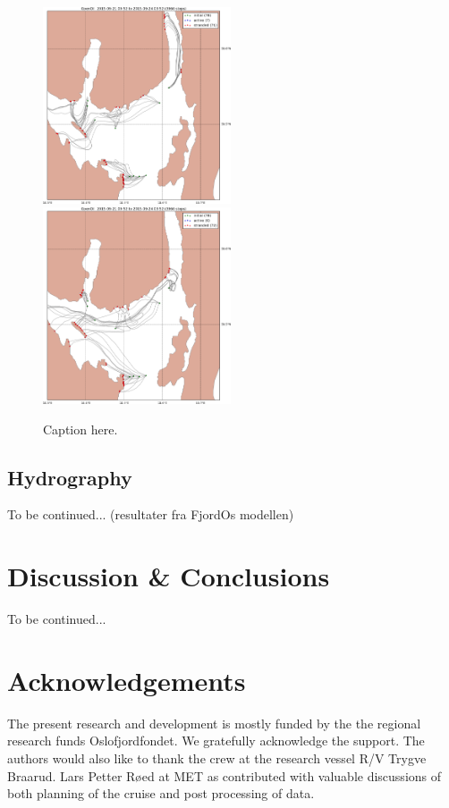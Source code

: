 \documentclass[12pt,a4paper,english]{article}
\begin{document}
\begin{figure}[ht]
\centerline{
\includegraphics*[width=0.495\textwidth]{Opendrift_simulations/LTR3/tokt_drifters_winddrift_0p5_radius_0_num_6_plusminus_2p5h_crop}
\includegraphics*[width=0.495\textwidth]{Opendrift_simulations/LTR3/tokt_drifters_winddrift_0p5_radius_0_num_6_plusminus_2p5h_norkyst_crop}
}
\caption{\small
Caption here.
}
\label{fig:opendriftD2}
\end{figure}


\subsection{Hydrography}

To be continued... (resultater fra FjordOs modellen)

\clearpage

\section{Discussion \& Conclusions}

To be continued...


\clearpage
\section*{\hspace{17mm}Acknowledgements}
The present research and development is mostly funded by the the regional research funds Oslofjordfondet. We gratefully acknowledge the support. The authors would also like to thank the crew at the research vessel R/V Trygve Braarud. Lars Petter R\o ed at MET as contributed with valuable discussions of both planning of the cruise and post processing of data. 
\end{document}
